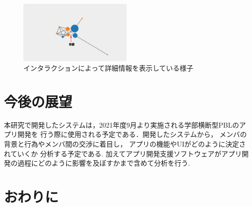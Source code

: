 \documentclass[submit,techrep]{ipsj}
\begin{document}
\begin{figure}[h]
  \centering
  \includegraphics[width=0.5\textwidth]{img/cop-map-detail.eps}
  \caption{インタラクションによって詳細情報を表示している様子}
  \label{cop-map-detail}
\end{figure}

\section{今後の展望}

本研究で開発したシステムは，2021年度9月より実施される学部横断型PBLのアプリ開発を
行う際に使用される予定である．開発したシステムから，
メンバの背景と行為やメンバ間の交渉に着目し，
アプリの機能やUIがどのように決定されていくか 分析する予定である.
加えてアプリ開発支援ソフトウェアがアプリ開発の過程にどのように影響を及ぼすかまで含めて分析を行う.


\section{おわりに}

\end{document}
